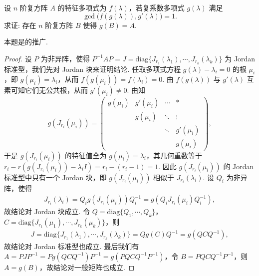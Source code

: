 \documentclass[../../main.tex]{subfiles}%
\begin{document}
\begin{example}
设 \( n \) 阶复方阵 \( A \) 的特征多项式为 \( f(\lambda) \)，若复系数多项式 \( g(\lambda) \) 满足
\[
\gcd\bigl(f(g(\lambda)), g'(\lambda)\bigr) = 1.
\]
求证: 存在 \( n \) 阶复方阵 \( B \) 使得 \( g(B) = A \).
\end{example}
\begin{note}
本题是的推广.
\end{note}
\begin{proof}

设 \( P \) 为非异阵，使得 \( P^{-1}AP = J = \mathrm{diag}\{J_{r_1}(\lambda_1), \cdots, J_{r_k}(\lambda_k)\} \) 为 Jordan 标准型，我们先对 Jordan 块来证明结论. 任取多项式方程 \( g(\lambda) - \lambda_i = 0 \) 的根 \( \mu_i \)，即 \( g(\mu_i) = \lambda_i \)，从而 \( f(g(\mu_i)) = f(\lambda_i) = 0 \). 由 \( f(g(\lambda)) \) 与 \( g'(\lambda) \) 互素可知它们无公共根，从而 \( g'(\mu_i) \neq 0 \). 由知
\[
g(J_{r_i}(\mu_i)) = \begin{pmatrix} 
g(\mu_i) & g'(\mu_i) & \cdots & * \\
& g(\mu_i) & \ddots & \vdots \\
& & \ddots & g'(\mu_i) \\
& & & g(\mu_i)
\end{pmatrix},
\]
于是 \( g(J_{r_i}(\mu_i)) \) 的特征值全为 \( g(\mu_i)=\lambda_i \)，其几何重数等于 \( r_i - r(g(J_{r_i}(\mu_i)) - \lambda_i I) = r_i - (r_i - 1) = 1 \). 因此 \( g(J_{r_i}(\mu_i)) \) 的 Jordan 标准型中只有一个 Jordan 块，即 \( g(J_{r_i}(\mu_i)) \) 相似于 \( J_{r_i}(\lambda_i) \). 设 \( Q_i \) 为非异阵，使得 
\begin{align*}
J_{r_i}(\lambda_i) = Q_i g(J_{r_i}(\mu_i)) Q_i^{-1} = g(Q_i J_{r_i}(\mu_i) Q_i^{-1}),
\end{align*}
故结论对 Jordan 块成立. 令 \( Q = \mathrm{diag}\{Q_1, \cdots, Q_k\} \)，\( C = \mathrm{diag}\{J_{r_1}(\mu_1), \cdots, J_{r_k}(\mu_k)\} \)，则
\begin{align*}
J = \mathrm{diag}\{J_{r_1}(\lambda_1), \cdots, J_{r_k}(\lambda_k)\} = Q g(C) Q^{-1} = g(Q C Q^{-1}),
\end{align*}
故结论对 Jordan 标准型也成立. 最后我们有 \( A = P J P^{-1} = P g(Q C Q^{-1}) P^{-1} = g(P Q C Q^{-1} P^{-1}) \)，令 \( B = P Q C Q^{-1} P^{-1} \)，则 \( A = g(B) \)，故结论对一般矩阵也成立. 

\end{proof}
\end{document}
